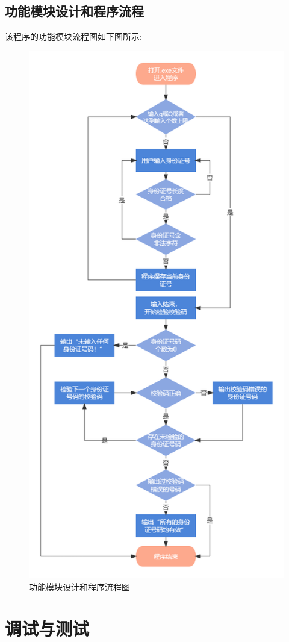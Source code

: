 \documentclass[withoutpreface,bwprint]{cumcmthesis}  %
\begin{document}
		\subsection{功能模块设计和程序流程}
		该程序的功能模块流程图如下图所示:
		
		\begin{figure}[H]
			
			\label{chengxuliucheng}     %
			\centering
			\includegraphics[width=.7\textwidth]{程序流程.png}
			\caption{功能模块设计和程序流程图}  %
		\end{figure}
		
		
		
		\newpage
		\section {调试与测试}
\end{document}
